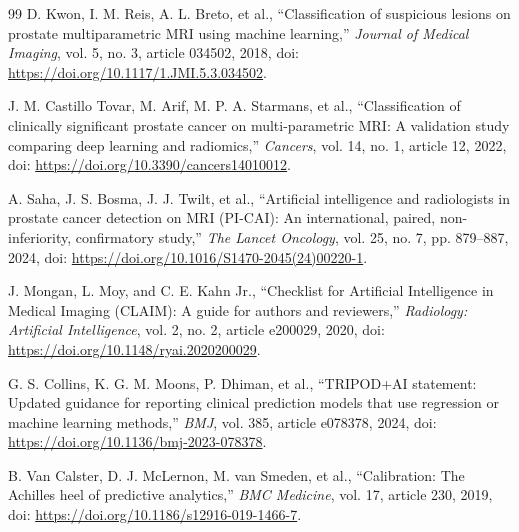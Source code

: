 \begin{thebibliography}{99}
 D. Kwon, I. M. Reis, A. L. Breto, et al., ``Classification of suspicious lesions on prostate multiparametric MRI using machine learning,'' \emph{Journal of Medical Imaging}, vol. 5, no. 3, article 034502, 2018, doi: \url{https://doi.org/10.1117/1.JMI.5.3.034502}.

 J. M. Castillo Tovar, M. Arif, M. P. A. Starmans, et al., ``Classification of clinically significant prostate cancer on multi-parametric MRI: A validation study comparing deep learning and radiomics,'' \emph{Cancers}, vol. 14, no. 1, article 12, 2022, doi: \url{https://doi.org/10.3390/cancers14010012}.

 A. Saha, J. S. Bosma, J. J. Twilt, et al., ``Artificial intelligence and radiologists in prostate cancer detection on MRI (PI-CAI): An international, paired, non-inferiority, confirmatory study,'' \emph{The Lancet Oncology}, vol. 25, no. 7, pp. 879--887, 2024, doi: \url{https://doi.org/10.1016/S1470-2045(24)00220-1}.

 J. Mongan, L. Moy, and C. E. Kahn Jr., ``Checklist for Artificial Intelligence in Medical Imaging (CLAIM): A guide for authors and reviewers,'' \emph{Radiology: Artificial Intelligence}, vol. 2, no. 2, article e200029, 2020, doi: \url{https://doi.org/10.1148/ryai.2020200029}.

 G. S. Collins, K. G. M. Moons, P. Dhiman, et al., ``TRIPOD+AI statement: Updated guidance for reporting clinical prediction models that use regression or machine learning methods,'' \emph{BMJ}, vol. 385, article e078378, 2024, doi: \url{https://doi.org/10.1136/bmj-2023-078378}.

 B. Van Calster, D. J. McLernon, M. van Smeden, et al., ``Calibration: The Achilles heel of predictive analytics,'' \emph{BMC Medicine}, vol. 17, article 230, 2019, doi: \url{https://doi.org/10.1186/s12916-019-1466-7}.

\end{thebibliography}